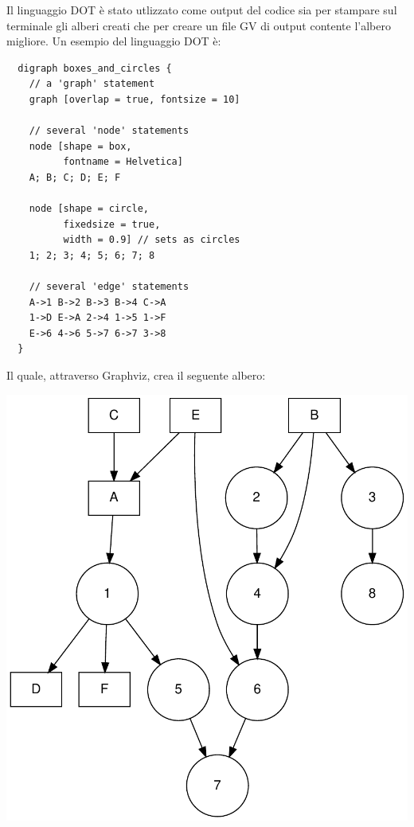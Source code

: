 \documentclass[12pt]{report}
\begin{document}
  Il linguaggio DOT è stato utlizzato come output del codice sia per stampare sul terminale gli alberi creati che per creare un file GV di output contente l'albero migliore.
  Un esempio del linguaggio DOT è:
  \begin{small}
  \begin{verbatim}
  digraph boxes_and_circles {
    // a 'graph' statement
    graph [overlap = true, fontsize = 10]

    // several 'node' statements
    node [shape = box,
          fontname = Helvetica]
    A; B; C; D; E; F

    node [shape = circle,
          fixedsize = true,
          width = 0.9] // sets as circles
    1; 2; 3; 4; 5; 6; 7; 8

    // several 'edge' statements
    A->1 B->2 B->3 B->4 C->A
    1->D E->A 2->4 1->5 1->F
    E->6 4->6 5->7 6->7 3->8
  }
  \end{verbatim}
  \end{small}
  Il quale, attraverso Graphviz, crea il seguente albero:
  \begin{center}
  \includegraphics[scale = 0.4]{img/esempio.pdf}
  \end{center}
\end{document}
